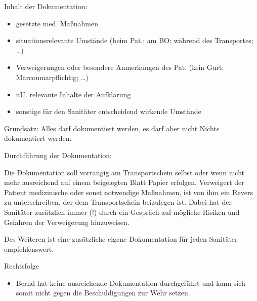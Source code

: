 \documentclass{article}
\begin{document}
Inhalt der Dokumentation:

\begin{itemize}
\item gesetzte med. Ma{\ss}nahmen

\item situationsrelevante Umst\"ande (beim Pat.; am BO; w\"ahrend des
Transportes; {\dots})

\item Verweigerungen oder besondere Anmerkungen des Pat. (kein Gurt;
Marcoumarpflichtig; {\dots})

\item uU. relevante Inhalte der Aufkl\"arung

\item sonstige f\"ur den Sanit\"ater entscheidend wirkende Umst\"ande 

\end{itemize}
Grundsatz: Alles darf dokumentiert werden, es darf aber nicht Nichts
dokumentiert werden. 

Durchf\"uhrung der Dokumentation:

Die Dokumentation soll vorrangig am Transportschein selbst oder wenn
nicht mehr ausreichend auf einem beigelegten Blatt Papier erfolgen.
Verweigert der Patient medizinische oder sonst notwendige
Ma{\ss}nahmen, ist von ihm ein Revers zu unterschreiben, der dem
Transportschein beizulegen ist. Dabei hat der Sanit\"ater zus\"atzlich
immer (!) durch ein Gespr\"ach auf m\"ogliche Risiken und Gefahren der
Verweigerung hinzuweisen.

Des Weiteren ist eine zus\"atzliche eigene Dokumentation f\"ur jeden
Sanit\"ater empfehlenswert.

Rechtsfolge

\begin{itemize}
\item Bernd hat keine ausreichende Dokumentation durchgef\"uhrt und kann
sich somit nicht gegen die Beschuldigungen zur Wehr setzen.

\end{itemize}
\end{document}
